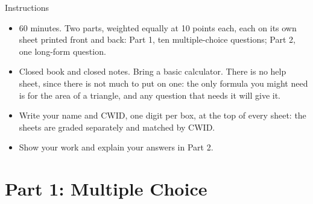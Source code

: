 

\ifsolutions
{}
\else
{}
\begin{notepanel}{Instructions}
\begin{itemize}
\item 60 minutes. Two parts, weighted equally at 10 points each, each on its own sheet printed front and back: Part 1, ten multiple-choice questions; Part 2, one long-form question.
\item Closed book and closed notes. Bring a basic calculator. There is no help sheet, since there is not much to put on one: the only formula you might need is for the area of a triangle, and any question that needs it will give it.
\item Write your name and CWID, one digit per box, at the top of every sheet: the sheets are graded separately and matched by CWID.
\item Show your work and explain your answers in Part 2.
\end{itemize}
\end{notepanel}
\fi

\section{Part 1: Multiple Choice }

